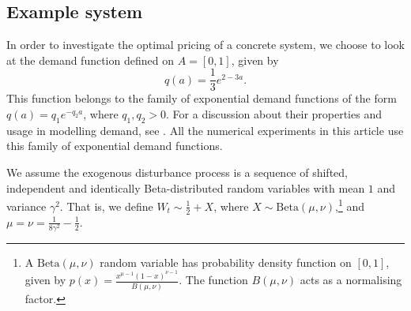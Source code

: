 \documentclass[main.tex]{subfiles}
\begin{document}
\subsection{Example system}\label{sec:bellman_example_markdown}
In order to investigate the optimal pricing of a concrete system, we
choose to look at the demand function
defined on $A=[0,1]$,
given by
\begin{equation}
  q(a)={\textstyle\frac{1}{3}}e^{2-3a}.
\end{equation}
This function belongs to the family of exponential demand functions of
the form $q(a)=q_1e^{-q_2a}$, where $q_1,q_2>0$. For a discussion
about their properties and usage in modelling demand, see \citet[Ch.~7]{talluri2006theory}.
All the numerical experiments in this article use this family of exponential
demand functions.

We assume the exogenous disturbance process is a sequence of
shifted, independent and identically Beta-distributed random
variables with mean $1$ and variance
$\gamma^2$. That is, we define $W_t\sim \frac{1}{2}+X$, where
$X\sim \mathrm{Beta}(\mu,\nu)$,\footnote{
  A $\mathrm{Beta}(\mu,\nu)$ random variable has probability density
  function on $[0,1]$, given by
  $p(x)=\frac{x^{\mu-1}{(1-x)}^{\nu-1}}{B(\mu,\nu)}$.
  The function $B(\mu,\nu)$ acts as a normalising factor.
}
and $\mu=\nu=\frac{1}{8\gamma^2}-\frac{1}{2}$.
\end{document}
